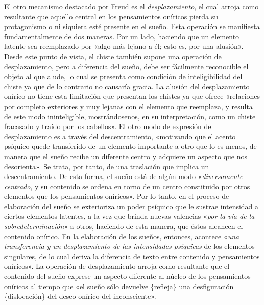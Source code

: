 El otro mecanismo destacado por Freud es el \emph{desplazamiento}, el cual arroja como resultante que aquello central en los pensamientos oníricos pierda su protagonismo o ni siquiera esté presente en el sueño. Esta operación se manifiesta fundamentalmente de dos maneras. Por un lado, haciendo que un elemento latente sea reemplazado por «algo más lejano a él; esto es, por una alusión». Desde este punto de vista, el chiste también supone una operación de desplazamiento, pero a diferencia del sueño, debe ser fácilmente reconocible el objeto al que alude, lo cual se presenta como condición de inteligibilidad del chiste ya que de lo contrario no causaría gracia. La alusión del desplazamiento onírico no tiene esta limitación que presentan los chistes ya que ofrece «relaciones por completo exteriores y muy lejanas con el elemento que reemplaza, y resulta de este modo ininteligible, mostrándosenos, en su interpretación, como un chiste fracasado y traído por los cabellos». El otro modo de expresión del desplazamiento es a través del descentramiento, «motivando que el acento psíquico quede transferido de un elemento importante a otro que lo es menos, de manera que el sueño recibe un diferente centro y adquiere un aspecto que nos desorienta». Se trata, por tanto, de una traslación que implica un descentramiento. De esta forma, el sueño está de algún modo «\emph{diversamente centrado}, y su contenido se ordena en torno de un centro constituido por otros elementos que los pensamientos oníricos». Por lo tanto, en el proceso de elaboración del sueño se exterioriza un poder psíquico que le sustrae intensidad a ciertos elementos latentes, a la vez que brinda nuevas valencias «\emph{por la vía de la sobredeterminación}» a otros, haciendo de esta manera, que éstos alcancen el contenido onírico. En la elaboración de los sueños, entonces, acontece «\emph{una transferencia y un desplazamiento de las intensidades psíquicas} de los elementos singulares, de lo cual deriva la diferencia de texto entre contenido y pensamientos oníricos». La operación de desplazamiento arroja como resultante que el contenido del sueño exprese un aspecto diferente al núcleo de los pensamientos oníricos al tiempo que «el sueño sólo devuelve \{refleja\} una desfiguración \{dislocación\} del deseo onírico del inconsciente».

